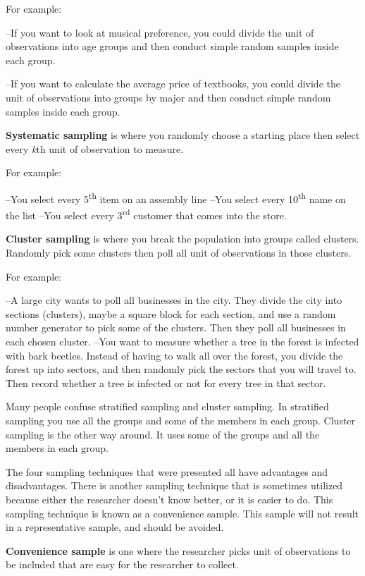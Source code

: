 \documentclass[]{book}
\begin{document}
For example:

--If you want to look at musical preference, you could divide the unit of observations into age groups and then conduct simple random samples inside each group.

--If you want to calculate the average price of textbooks, you could divide the unit of observations into groups by major and then conduct simple random samples inside each group.

\textbf{Systematic sampling} is where you randomly choose a starting place
then select every \emph{k}th unit of observation to measure.

For example:

--You select every 5\textsuperscript{th} item on an assembly line
--You select every 10\textsuperscript{th} name on the list
--You select every 3\textsuperscript{rd} customer that comes into the store.

\textbf{Cluster sampling} is where you break the population into groups
called clusters. Randomly pick some clusters then poll all unit of observations in those clusters.

For example:

--A large city wants to poll all businesses in the city. They divide the city into sections (clusters), maybe a square block for each section, and use a random number generator to pick some of the clusters. Then they poll all businesses in each chosen cluster.
--You want to measure whether a tree in the forest is infected with bark beetles. Instead of having to walk all over the forest, you divide the forest up into sectors, and then randomly pick the sectors that you will travel to. Then record whether a tree is infected or not for every tree in that sector.

Many people confuse stratified sampling and cluster sampling. In stratified sampling you use {all} the groups and {some} of the members in each group. Cluster sampling is the other way around. It uses {some} of the groups and {all} the members in each group.

The four sampling techniques that were presented all have advantages and disadvantages. There is another sampling technique that is sometimes utilized because either the researcher doesn't know better, or it is easier to do. This sampling technique is known as a convenience sample. This sample will not result in a representative sample, and should be avoided.

\textbf{Convenience sample} is one where the researcher picks unit of observations to be included that are easy for the researcher to collect.
\end{document}
